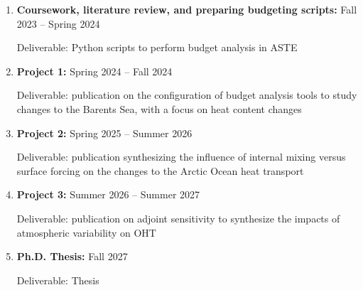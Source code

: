 \documentclass[a4paper,12pt]{article}
\begin{document}
    \begin{enumerate}
        \item \textbf{Coursework, literature review, and preparing budgeting scripts:} Fall 2023 -- Spring 2024

        Deliverable: Python scripts to perform budget analysis in ASTE
        
        \item \textbf{Project 1:} Spring 2024 -- Fall 2024
        
        Deliverable: publication on the configuration of budget analysis tools to study changes to the Barents Sea, with a focus on heat content changes
        
        \item \textbf{Project 2:} Spring 2025 -- Summer 2026

        Deliverable: publication synthesizing the influence of internal mixing versus surface forcing on the changes to the Arctic Ocean heat transport 

        \item \textbf{Project 3:} Summer 2026 -- Summer 2027

        Deliverable: publication on adjoint sensitivity to synthesize the impacts of atmospheric variability on OHT

        \item \textbf{Ph.D. Thesis:} Fall 2027

        Deliverable: Thesis
    \end{enumerate}
    

 		
    
\end{document}
